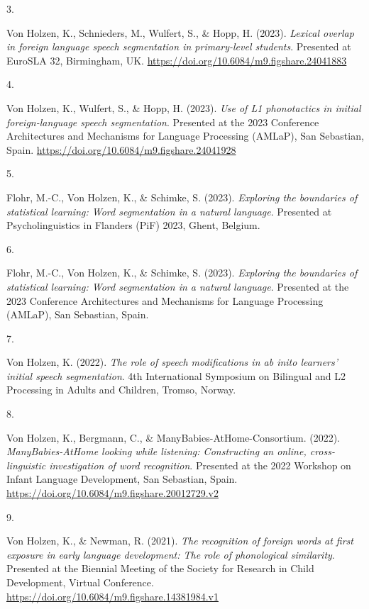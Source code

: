 \documentclass[10pt,a4paper,]{article}
\newlength{\cslhangindent}
\newlength{\csllabelwidth}
\newcommand{\CSLLeftMargin}[1]{\parbox[t]{\csllabelwidth}{\hfill #1~}}
\newcommand{\CSLRightInline}[1]{\parbox[t]{\linewidth - \cslhangindent - \csllabelwidth}{#1}\vspace{0.8ex}}
\begin{document}
\leavevmode{}%
\CSLLeftMargin{3. }%
\CSLRightInline{Von Holzen, K., Schnieders, M., Wulfert, S., \& Hopp, H.
(2023). \emph{Lexical overlap in foreign language speech segmentation in
primary-level students}. Presented at EuroSLA 32, Birmingham, UK.
\url{https://doi.org/10.6084/m9.figshare.24041883}}

\leavevmode{}%
\CSLLeftMargin{4. }%
\CSLRightInline{Von Holzen, K., Wulfert, S., \& Hopp, H. (2023).
\emph{Use of L1 phonotactics in initial foreign-language speech
segmentation}. Presented at the 2023 Conference Architectures and
Mechanisms for Language Processing (AMLaP), San Sebastian, Spain.
\url{https://doi.org/10.6084/m9.figshare.24041928}}

\leavevmode{}%
\CSLLeftMargin{5. }%
\CSLRightInline{Flohr, M.-C., Von Holzen, K., \& Schimke, S. (2023).
\emph{Exploring the boundaries of statistical learning: Word
segmentation in a natural language}. Presented at Psycholinguistics in
Flanders (PiF) 2023, Ghent, Belgium.}

\leavevmode{}%
\CSLLeftMargin{6. }%
\CSLRightInline{Flohr, M.-C., Von Holzen, K., \& Schimke, S. (2023).
\emph{Exploring the boundaries of statistical learning: Word
segmentation in a natural language}. Presented at the 2023 Conference
Architectures and Mechanisms for Language Processing (AMLaP), San
Sebastian, Spain.}

\leavevmode{}%
\CSLLeftMargin{7. }%
\CSLRightInline{Von Holzen, K. (2022). \emph{The role of speech
modifications in ab inito learners' initial speech segmentation}. 4th
International Symposium on Bilingual and L2 Processing in Adults and
Children, Tromso, Norway.}

\leavevmode{}%
\CSLLeftMargin{8. }%
\CSLRightInline{Von Holzen, K., Bergmann, C., \&
ManyBabies-AtHome-Consortium. (2022). \emph{ManyBabies-AtHome looking
while listening: Constructing an online, cross-linguistic investigation
of word recognition}. Presented at the 2022 Workshop on Infant Language
Development, San Sebastian, Spain.
\url{https://doi.org/10.6084/m9.figshare.20012729.v2}}

\leavevmode{}%
\CSLLeftMargin{9. }%
\CSLRightInline{Von Holzen, K., \& Newman, R. (2021). \emph{The
recognition of foreign words at first exposure in early language
development: The role of phonological similarity}. Presented at the
Biennial Meeting of the Society for Research in Child Development,
Virtual Conference.
\url{https://doi.org/10.6084/m9.figshare.14381984.v1}}
\end{document}
